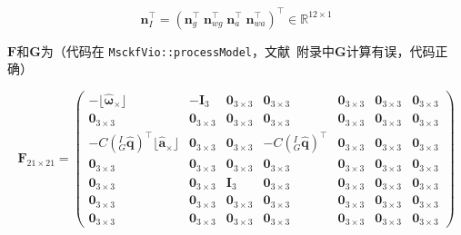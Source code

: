 \documentclass[12pt,a4paper]{article}
\begin{document}
$$
\mathbf{n}_I^\top = 
\left(
\mathbf{n}_g^\top \; \mathbf{n}_{wg}^\top \; \mathbf{n}_a^\top \; \mathbf{n}_{wa}^\top
\right)^\top
\in \mathbb{R}^{12 \times 1}
$$

$\mathbf{F}$和$\mathbf{G}$为（代码在 \verb|MsckfVio::processModel|，文献~\citep{sun2018robust}附录中$\mathbf{G}$计算有误，代码正确）

\begin{equation*}
\mathbf{F}_{21 \times 21} = 
\begin{pmatrix}
-\lfloor\hat{\boldsymbol{\omega}}{}_{\times}\rfloor & -\mathbf{I}_3 & 
\mathbf{0}_{3\times 3} & \mathbf{0}_{3\times 3} & \mathbf{0}_{3\times 3} & \mathbf{0}_{3\times 3} & \mathbf{0}_{3\times 3} \\
\mathbf{0}_{3\times 3} & \mathbf{0}_{3\times 3} & \mathbf{0}_{3\times 3} & 
\mathbf{0}_{3\times 3} & \mathbf{0}_{3\times 3} & \mathbf{0}_{3\times 3} & \mathbf{0}_{3\times 3} \\
-C\left({}^I_G\hat{\mathbf{q}}\right)^\top\lfloor\hat{\mathbf{a}}{}_{\times}\rfloor & 
\mathbf{0}_{3\times 3} & \mathbf{0}_{3\times 3} & 
-C\left({}^I_G\hat{\mathbf{q}}\right)^\top & \mathbf{0}_{3\times 3} & \mathbf{0}_{3\times 3} & \mathbf{0}_{3\times 3} \\
\mathbf{0}_{3\times 3} & \mathbf{0}_{3\times 3} & \mathbf{0}_{3\times 3} & 
\mathbf{0}_{3\times 3} & \mathbf{0}_{3\times 3} & \mathbf{0}_{3\times 3} & \mathbf{0}_{3\times 3} \\
\mathbf{0}_{3\times 3} & \mathbf{0}_{3\times 3} & \mathbf{I}_3 & 
\mathbf{0}_{3\times 3} & \mathbf{0}_{3\times 3} & \mathbf{0}_{3\times 3} & \mathbf{0}_{3\times 3} \\
\mathbf{0}_{3\times 3} & \mathbf{0}_{3\times 3} & \mathbf{0}_{3\times 3} & 
\mathbf{0}_{3\times 3} & \mathbf{0}_{3\times 3} & \mathbf{0}_{3\times 3} & \mathbf{0}_{3\times 3} \\
\mathbf{0}_{3\times 3} & \mathbf{0}_{3\times 3} & \mathbf{0}_{3\times 3} & 
\mathbf{0}_{3\times 3} & \mathbf{0}_{3\times 3} & \mathbf{0}_{3\times 3} & \mathbf{0}_{3\times 3}
\end{pmatrix}
\end{equation*}
\end{document}
